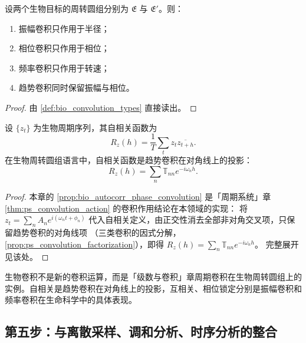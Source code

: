 \begin{theorem}[三类卷积在生物周转圆组上的作用]\label{thm:bio_convolution_action}
设两个生物目标的周转圆组分别为 $\mathfrak E$ 与 $\mathfrak E'$。则：
\begin{enumerate}[label=(\roman*)]
    \item 振幅卷积只作用于半径；
    \item 相位卷积只作用于相位；
    \item 频率卷积只作用于转速；
    \item 趋势卷积同时保留振幅与相位。
\end{enumerate}
\end{theorem}

\begin{proof}
由 \cref{def:bio_convolution_types} 直接读出。
\end{proof}

\begin{proposition}[自相关与趋势卷积]\label{prop:bio_autocorr_phase_convolution}
设 $\{z_t\}$ 为生物周期序列，其自相关函数为
\[
R_z(h)=\frac1T\sum_t z_t\overline{z_{t+h}}.
\]
在生物周转圆组语言中，自相关函数是趋势卷积在对角线上的投影：
\[
R_z(h)=\sum_n\mathbb T_{nn}e^{-i\omega_n h}.
\]
\end{proposition}

\begin{proof}
本章的 \cref{prop:bio_autocorr_phase_convolution} 是「周期系统」章 \cref{thm:ps_convolution_action} 的卷积作用结论在本领域的实现：
将 $z_t=\sum_n A_n e^{i(\omega_n t+\phi_n)}$ 代入自相关定义，由正交性消去全部非对角交叉项，只保留趋势卷积的对角线项
（三类卷积的因式分解，\cref{prop:ps_convolution_factorization}），即得 $R_z(h)=\sum_n\mathbb T_{nn}e^{-i\omega_n h}$。
完整展开见该处。
\end{proof}

\begin{remark}[生物卷积与周期卷积的关系]\label{rem:bio_convolution_relation}
生物卷积不是新的卷积运算，而是「级数与卷积」章周期卷积在生物周转圆组上的实例。自相关是趋势卷积在对角线上的投影，互相关、相位锁定分别是振幅卷积和频率卷积在生命科学中的具体表现。
\end{remark}

\subsection{第五步：与离散采样、调和分析、时序分析的整合}

